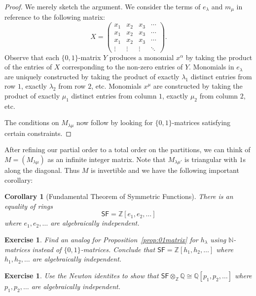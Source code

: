 \documentclass[12pt]{article}
\theoremstyle{plain}
\newtheorem{corollary}[theorem]{Corollary}
\newtheorem{exercise}[theorem]{Exercise}
\theoremstyle{definition}
\theoremstyle{remark}
\numberwithin{equation}{section}
\begin{document}
\begin{proof}
We merely sketch the argument.
We consider the terms of $e_\lambda$ and $m_\mu$ in reference to the
following matrix:
\[
X = \begin{pmatrix}
x_1 & x_2 & x_3 & \cdots \\
x_1 & x_2 & x_3 & \cdots \\
x_1 & x_2 & x_3 & \cdots \\
\vdots & \vdots & \vdots & \ddots
\end{pmatrix}.
\]
Observe that each $\{0,1\}$-matrix $Y$ produces a monomial $x^\alpha$
by taking the product of the entries of $X$ corresponding to the
non-zero entries of $Y$.
Monomials in $e_\lambda$ are uniquely constructed by
taking the product of exactly $\lambda_1$ distinct entries from row $1$,
exactly $\lambda_2$ from row $2$, etc.
Monomials $x^\mu$ are constructed by
taking the product of exactly $\mu_1$ distinct entries from column $1$,
exactly $\mu_2$ from column $2$, etc.

The conditions on $M_{\lambda\mu}$ now follow by looking for
$\{0,1\}$-matrices satisfying certain constraints.
\end{proof}

After refining our partial order to a total order
on the partitions, we can think of $M=\left(M_{\lambda\mu}\right)$ as
an infinite integer matrix.
Note that $M_{\lambda\mu'}$ is triangular with $1$s along the diagonal.
Thus $M$ is invertible and we have the following important corollary:

\begin{corollary}[Fundamental Theorem of Symmetric Functions]
There is an equality of rings
\[\mathsf{SF} = \mathbb{Z}[e_1,e_2,\ldots] \]
where $e_1,e_2,\ldots$ are algebraically independent.
\end{corollary}

\begin{exercise}
Find an analog for Proposition~\ref{prop:01matrix} for $h_\lambda$
using $\mathbb{N}$-matrices instead of $\{0,1\}$-matrices.
Conclude that 
$\mathsf{SF} = \mathbb{Z}[h_1,h_2,\ldots]$
where $h_1,h_2,\ldots$ are algebraically independent.
\end{exercise}

\begin{exercise}
Use the Newton identites to show that 
$\mathsf{SF} \otimes_{\mathbb{Z}} \mathbb{Q} \cong \mathbb{Q}[p_1,p_2,\ldots]$
where $p_1,p_2,\ldots$ are algebraically independent.
\end{exercise}
\end{document}
